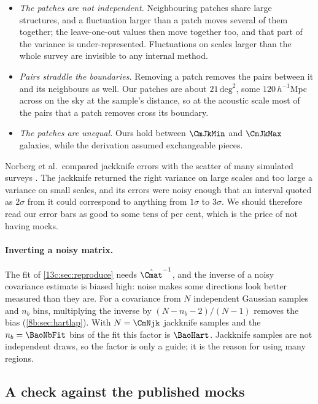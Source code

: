 \begin{itemize}[itemsep=1pt,leftmargin=1.2em]
  \item \emph{The patches are not independent.} Neighbouring patches share large
        structures, and a fluctuation larger than a patch moves several of them
        together; the leave-one-out values then move together too, and that part
        of the variance is under-represented. Fluctuations on scales larger than
        the whole survey are invisible to any internal method.
  \item \emph{Pairs straddle the boundaries.} Removing a patch removes the pairs
        between it and its neighbours as well. Our patches are about $21\,\mathrm{deg}^2$,
        some $120\,h^{-1}$Mpc across on the sky at the sample's distance, so at the
        acoustic scale most of the pairs that a patch removes cross its boundary.
  \item \emph{The patches are unequal.} Ours hold between $\CmJkMin$ and $\CmJkMax$
        galaxies, while the derivation assumed exchangeable pieces.
\end{itemize}
Norberg et al.\ compared jackknife errors with the scatter of many simulated surveys
\cite{Norberg2009}. The jackknife returned the right variance on large scales and too
large a variance on small scales, and its errors were noisy enough that an interval
quoted as $2\sigma$ from it could correspond to anything from $1\sigma$ to $3\sigma$.
We should therefore read our error bars as good to some tens of per cent, which is
the price of not having mocks.

\paragraph{Inverting a noisy matrix.}
The fit of \cref{13c:sec:reproduce} needs $\hat\Cmat^{-1}$, and the inverse of a noisy
covariance estimate is biased high: noise makes some directions look better measured
than they are. For a covariance from $N$ independent Gaussian samples and $n_b$ bins,
multiplying the inverse by $(N-n_b-2)/(N-1)$ removes the bias
(\cref{8b:sec:hartlap}). With $N=\CmNjk$ jackknife samples and the $n_b=\BaoNbFit$ bins
of the fit this factor is $\BaoHart$. Jackknife samples are not independent draws,
so the factor is only a guide; it is the reason for using many regions.

\subsection{A check against the published mocks}
\label{13c:sec:jk-check}


